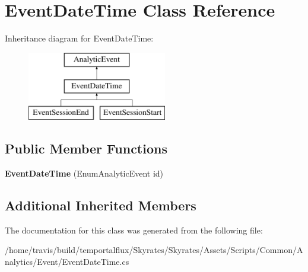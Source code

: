 \hypertarget{class_event_date_time}{\section{Event\-Date\-Time Class Reference}
\label{class_event_date_time}
}
Inheritance diagram for Event\-Date\-Time\-:\begin{figure}[H]
\begin{center}
\leavevmode
\includegraphics[height=3.000000cm]{class_event_date_time}
\end{center}
\end{figure}
\subsection*{Public Member Functions}
\begin{DoxyCompactItemize}
\item 
\hypertarget{class_event_date_time_a99a2946d853d30399dcff8dbf0d058d0}{{\bfseries Event\-Date\-Time} (Enum\-Analytic\-Event id)}\label{class_event_date_time_a99a2946d853d30399dcff8dbf0d058d0}

\end{DoxyCompactItemize}
\subsection*{Additional Inherited Members}


The documentation for this class was generated from the following file\-:\begin{DoxyCompactItemize}
\item 
/home/travis/build/temportalflux/\-Skyrates/\-Skyrates/\-Assets/\-Scripts/\-Common/\-Analytics/\-Event/Event\-Date\-Time.\-cs\end{DoxyCompactItemize}
